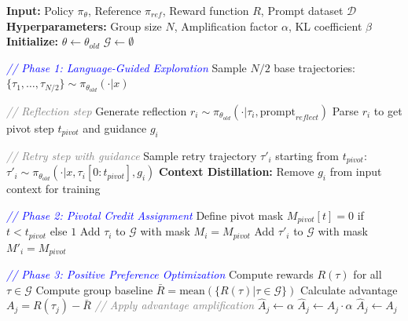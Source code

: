 \begin{algorithm*}[t]
\small
\caption{R$^3$L: Reflect, Retry, and Reinforce Learning}
\label{alg:r3l}
\begin{algorithmic}[1]
\STATE \textbf{Input:} Policy $\pi_{\theta}$, Reference $\pi_{ref}$, Reward function $R$, Prompt dataset $\mathcal{D}$
\STATE \textbf{Hyperparameters:} Group size $N$, Amplification factor $\alpha$, KL coefficient $\beta$
\STATE \textbf{Initialize:} $\theta \leftarrow \theta_{old}$
        \STATE $\mathcal{G} \leftarrow \emptyset$ 

        \STATE \textcolor{blue}{\textit{// Phase 1: Language-Guided Exploration}}
        \STATE Sample $N/2$ base trajectories: $\{\tau_1, \dots, \tau_{N/2}\} \sim \pi_{\theta_{old}}(\cdot|x)$

            \STATE \textcolor{gray}{\textit{// Reflection step}}
            \STATE Generate reflection $r_i \sim \pi_{\theta_{old}}(\cdot | \tau_i, \text{prompt}_{reflect})$
            \STATE Parse $r_i$ to get pivot step $t_{pivot}$ and guidance $g_i$

            \STATE \textcolor{gray}{\textit{// Retry step with guidance}}
            \STATE Sample retry trajectory $\tau'_i$ starting from $t_{pivot}$: $\tau'_i \sim \pi_{\theta_{old}}(\cdot | x, \tau_i[0:t_{pivot}], g_i)$
            \STATE \textbf{Context Distillation:} Remove $g_i$ from input context for training

            \STATE \textcolor{blue}{\textit{// Phase 2: Pivotal Credit Assignment}}
            \STATE Define pivot mask $M_{pivot}[t] = 0$ if $t < t_{pivot}$ else $1$
            \STATE Add $\tau_i$ to $\mathcal{G}$ with mask $M_i = M_{pivot}$ 
            \STATE Add $\tau'_i$ to $\mathcal{G}$ with mask $M'_i = M_{pivot}$ 
        \ENDFOR

        \STATE \textcolor{blue}{\textit{// Phase 3: Positive Preference Optimization}}
        \STATE Compute rewards $R(\tau)$ for all $\tau \in \mathcal{G}$
        \STATE Compute group baseline $\bar{R} = \text{mean}(\{R(\tau) | \tau \in \mathcal{G}\})$
            \STATE Calculate advantage $A_j = R(\tau_j) - \bar{R}$
            \STATE \textcolor{gray}{\textit{// Apply advantage amplification}}
                \STATE $\hat{A}_j \leftarrow \alpha$ 
                \STATE $\hat{A}_j \leftarrow A_j \cdot \alpha$ 
            \ELSE
                \STATE $\hat{A}_j \leftarrow A_j$ 
            \ENDIF
        \ENDFOR


\end{algorithmic}
\end{algorithm*}
